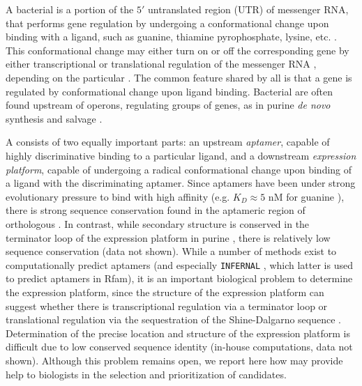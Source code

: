 A bacterial \rb is a portion of the $5'$
untranslated region (UTR) of messenger RNA,
that performs gene regulation by undergoing a conformational change upon
binding with a ligand, such as guanine, thiamine pyrophosphate, lysine,
etc.  \citep{breaker:Riboswitch2}.
This conformational change may either turn  on or off
the corresponding gene by either transcriptional or translational regulation
of the messenger RNA \citep{tuckerBreaker:review}, depending on the
particular \rb. The common feature shared by all \rbs
is that a gene is regulated by conformational change upon ligand binding.
Bacterial \rbs are often found upstream
of operons, regulating groups of genes, as in purine {\em de novo}
synthesis and salvage \citep{mandalBoeseBarrickWinklerBreaker}.

A \rb consists of two equally important parts: an upstream
{\em aptamer}, capable of highly discriminative binding to a particular
ligand, and a downstream {\em expression platform}, capable of undergoing
a radical conformational change upon binding of a ligand with the
discriminating aptamer.
Since aptamers have been under strong evolutionary pressure to
bind with high affinity
(e.g. $K_D \approx 5$ nM for guanine \citep{Mandal.nsmb04}),
there is strong
sequence conservation found in the aptameric region of orthologous
\rbs.
In contrast, while secondary structure is conserved in the
terminator loop of the expression platform in purine \rbs,
there is relatively low sequence conservation (data not shown).
While a number of methods exist to computationally predict
\rb aptamers
\citep{Bengert2004Riboswitch,Chang2009Computational,AbreuGoodger2005RibEx,Singh2009Riboswitch,Bergig.isb04}
(and especially {\tt INFERNAL} \citep{INFERNAL}, which latter is used
to predict \rb aptamers in Rfam), it is an important
biological problem to determine the expression platform, since the structure
of the expression platform can suggest whether there is
transcriptional regulation
via a terminator loop or translational regulation via the sequestration of
the Shine-Dalgarno sequence \citep{tuckerBreaker:review}. Determination of
the precise location and structure of the expression platform is difficult
due to low conserved sequence identity (in-house computations, data not shown).
Although this problem remains open, we report here how
\fftbor may provide help to biologists in the selection and
prioritization of \rb candidates.

